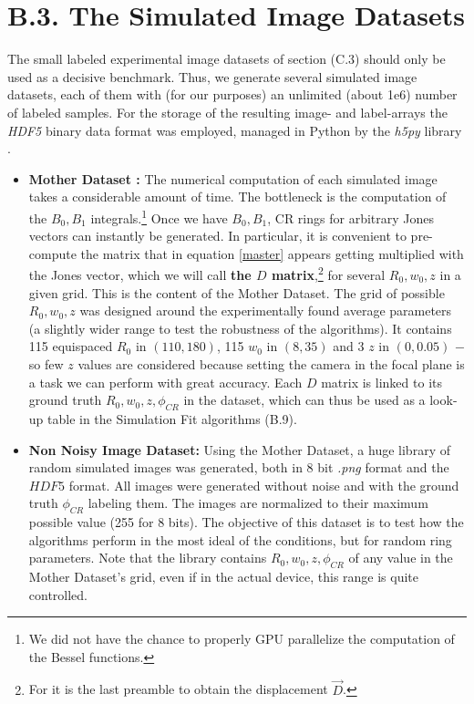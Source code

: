 \documentclass[11pt, a4paper, twoside]{article} %
\begin{document}
\section*{B.3. The Simulated Image Datasets }
The small labeled experimental image datasets of section (C.3) should only be used as a decisive benchmark. Thus, we generate several simulated image datasets, each of them with (for our purposes) an unlimited (about 1e6) number of labeled samples. For the storage of the resulting image- and label-arrays the {\em HDF5} binary data format was employed, managed in Python by the {\em h5py} library \cite{h5f}.\vspace{-0.1cm}
\begin{itemize}
\item {\bf Mother Dataset :} The numerical computation of each simulated image takes a considerable amount of time. The bottleneck is the computation of the $B_0,B_1$ integrals.\footnote{We did not have the chance to properly GPU parallelize the computation of the Bessel functions.} Once we have $B_0,B_1$, CR rings for arbitrary Jones vectors can instantly be generated. In particular, it is convenient to pre-compute the matrix that in equation \eqref{master} appears getting multiplied with the Jones vector, which we will call {\bf the $D$ matrix},\footnote{For it is the last preamble to obtain the displacement $\vec{D}$.} for several $R_0,w_0,z$ in a given grid. This is the content of the Mother Dataset. The grid of possible $R_0,w_0,z$ was designed around the experimentally found average parameters (a slightly wider range to test the robustness of the algorithms). It contains 115 equispaced $R_0$ in $(110,180)$, 115 $w_0$ in $(8,35)$ and 3 $z$ in $(0,0.05)$ $-$ so few $z$ values are considered because setting the camera in the focal plane is a task we can perform with great accuracy. Each $D$ matrix is linked to its ground truth $R_0,w_0,z,\phi_{CR}$ in the dataset, which can thus be used as a look-up table in the Simulation Fit algorithms (B.9).

\item {\bf Non Noisy Image Dataset:} Using the Mother Dataset, a huge library of random simulated images was generated, both in 8 bit {\em .png} format and the $HDF5$ format. All images were generated without noise and with the ground truth $\phi_{CR}$ labeling them. The images are normalized to their maximum possible value (255 for 8 bits). The objective of this dataset is to test how the algorithms perform in the most ideal of the conditions, but for random ring parameters. Note that the library contains $R_0,w_0,z,\phi_{CR}$ of any value in the Mother Dataset's grid, even if in the actual device, this range is quite controlled. 


\end{itemize}
\end{document}
